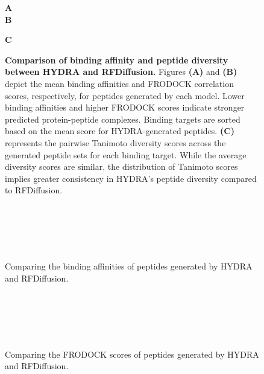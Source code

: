 \begin{figure}
  \center

  \textbf{\Large A}
   \\

  \textbf{\Large B}

  \textbf{\Large C}

  \caption{\textbf{Comparison of binding affinity and peptide diversity between HYDRA and RFDiffusion.} Figures \textbf{(A)} and \textbf{(B)} depict the mean binding affinities and FRODOCK correlation scores, respectively, for peptides generated by each model. Lower binding affinities and higher FRODOCK scores indicate stronger predicted protein-peptide complexes. Binding targets are sorted based on the mean score for HYDRA-generated peptides. \textbf{(C)} represents the pairwise Tanimoto diversity scores across the generated peptide sets for each binding target. While the average diversity scores are similar, the distribution of Tanimoto scores implies greater consistency in HYDRA's peptide diversity compared to RFDiffusion.}

  \label{fig:performance}
\end{figure}

\begin{figure}
  \center

   \\
   \\
   \\
   \\

  \caption{Comparing the binding affinities of peptides generated by HYDRA and RFDiffusion.}

  \label{fig:extended_vina_metrics}
\end{figure}

\begin{figure}
  \center

   \\
   \\
   \\
   \\

  \caption{Comparing the FRODOCK scores of peptides generated by HYDRA and RFDiffusion.}

  \label{fig:extended_frodock_metrics}
\end{figure}

